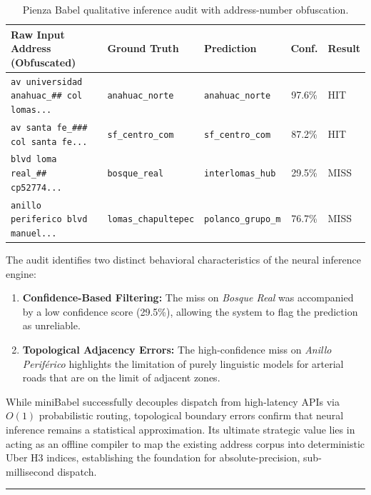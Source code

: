 \begin{table}[H]
    \centering
    \scriptsize
    \begin{tabularx}{\textwidth}{X l l c l}
        \toprule
        \textbf{Raw Input Address (Obfuscated)} & \textbf{Ground Truth} & \textbf{Prediction} & \textbf{Conf.} & \textbf{Result} \\
        \midrule
        \texttt{av universidad anahuac\_\#\# col lomas...} & \texttt{anahuac\_norte} & \texttt{anahuac\_norte} & 97.6\% & HIT \\
        \texttt{av santa fe\_\#\#\# col santa fe...} & \texttt{sf\_centro\_com} & \texttt{sf\_centro\_com} & 87.2\% & HIT \\
        \midrule
        \texttt{blvd loma real\_\#\# cp52774...} & \texttt{bosque\_real} & \texttt{interlomas\_hub} & 29.5\% & MISS \\
        \texttt{anillo periferico blvd manuel...} & \texttt{lomas\_chapultepec} & \texttt{polanco\_grupo\_m} & 76.7\% & MISS \\
        \bottomrule
    \end{tabularx}
    \caption{Pienza Babel qualitative inference audit with address-number obfuscation.}
    \label{tab:babel_audit}
\end{table}

The audit identifies two distinct behavioral characteristics of the neural inference engine:
\begin{enumerate}
    \item \textbf{Confidence-Based Filtering:} The miss on \textit{Bosque Real} was accompanied by a low confidence score (29.5\%), allowing the system to flag the prediction as unreliable. 
    \item \textbf{Topological Adjacency Errors:} The high-confidence miss on \textit{Anillo Periférico} highlights the limitation of purely linguistic models for arterial roads that are on the limit of adjacent zones.
\end{enumerate}


While miniBabel successfully decouples dispatch from high-latency APIs via $O(1)$ probabilistic routing, topological boundary errors confirm that neural inference remains a statistical approximation. Its ultimate strategic value lies in acting as an offline compiler to map the existing address corpus into deterministic Uber H3 indices, establishing the foundation for absolute-precision, sub-millisecond dispatch.

\vspace{0.4cm}
\rule{\linewidth}{0.4pt}


